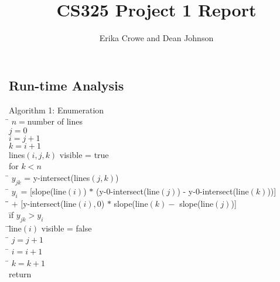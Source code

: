 \documentclass{article}
\title{CS325 Project 1 Report}
\author{Erika Crowe and Dean Johnson}
\begin{document}
\maketitle


\subsection*{Run-time Analysis}


\begin{tabbing}
  {\sc Algorithm 1: Enumeration}\\
  \qquad \= $n = $number of lines \\
  \> $j = 0$ \\
  \> $i = j+1$\\
  \> $k = i+1$\\
  \> lines$(i,j,k)$ visible = true\\
  \> for $k < n$\\
  \> \qquad \= $y_{jk}$ = y-intersect(lines$(j,k)$)\\
  \> \qquad \= $y_{i}$ = [slope(line$(i)$) $*$ (y-0-intersect(line$(j)$) - y-0-intersect(line$(k)$))]\\
  \> \qquad \= \qquad \= $+$  [y-intersect(line$(i),0$) $*$ slope(line$(k) -$ slope(line$(j)$)]\\ 
  \> \qquad \= if $y_{jk} > y_{i}$\\
  \> \qquad \= \qquad \= line$(i)$ visible = false\\
  \> \qquad \= $j = j+1$\\
  \> \qquad \= $i = i+1$\\
  \> \qquad \= $k = k+1$\\
  \> return
\end{tabbing}
\end{document}
